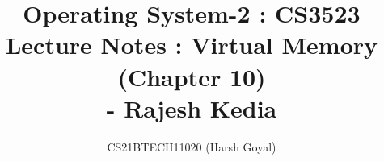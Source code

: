 \documentclass[12pt,onecolumn]{IEEEtran}
\begin{document}
\title{
   \textbf{ Operating System-2 : CS3523} \\ \LARGE Lecture Notes : Virtual Memory (Chapter 10)
   \\ \large - Rajesh Kedia  
}
%
%
%
\author{ CS21BTECH11020 (Harsh Goyal)%
}
% 
%
\end{document}
